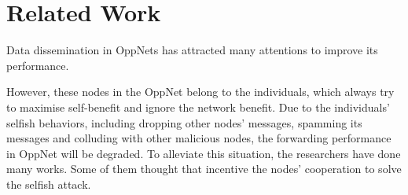 \section{Related Work}
\label{sec:related}
Data dissemination in OppNets has attracted many attentions
to improve its performance.

However, these nodes in the OppNet belong to the individuals,
which always try to maximise self-benefit and ignore the network benefit.
Due to the individuals' selfish behaviors, 
including dropping other nodes' messages, spamming its messages and colluding with other malicious nodes,
the forwarding performance in OppNet will be degraded.
To alleviate this situation,
the researchers have done many works.
Some of them thought that 
incentive the nodes' cooperation to solve the selfish attack.
